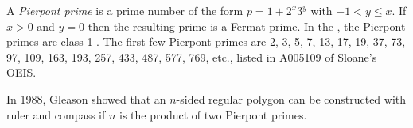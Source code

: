 \documentclass[12pt]{article}
\begin{document}
A {\em Pierpont prime} is a prime number of the form $p = 1 + 2^x3^y$ with $-1 < y \le x$. If $x > 0$ and $y = 0$ then the resulting prime is a Fermat prime. In the , the Pierpont primes are class 1-. The first few Pierpont primes are 2, 3, 5, 7, 13, 17, 19, 37, 73, 97, 109, 163, 193, 257, 433, 487, 577, 769, etc., listed in A005109 of Sloane's OEIS.

In 1988, Gleason showed that an $n$-sided regular polygon can be constructed with ruler and compass if $n$ is the product of two Pierpont primes.
\end{document}
